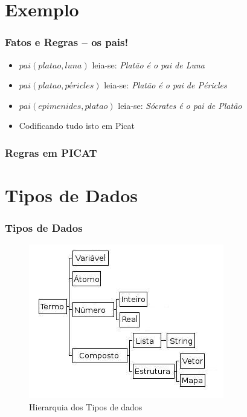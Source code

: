 \documentclass[10pt]{beamer}
\begin{document}

\section{Exemplo}
\begin{frame}
    \frametitle{Fatos e Regras -- os pais!}
    \begin{itemize}
    
    \item $pai(platao, luna)$ \hspace{1.5cm} leia-se: \textit{Platão é o pai de Luna}
    \item $pai(platao, péricles)$ \hspace{1.5cm} leia-se: \textit{Platão é o pai de Péricles}
    \item $pai(epimenides, platao)$ \hspace{1.5cm} leia-se: \textit{Sócrates é o pai de Platão}
    \item Codificando tudo isto  em Picat
    \end{itemize}
\end{frame}

\begin{frame}[allowframebreaks=0.9]
 \frametitle{Regras em PICAT}



\end{frame}



\section{Tipos de Dados}

\begin{frame}
\frametitle{Tipos de Dados}
\begin{figure}[!ht]
\centering
\includegraphics[width=.6\textwidth]{figures/tipos_dados_picat_traduzido.jpg}
\caption{Hierarquia dos Tipos de dados}
\label{Hiera}
\end{figure}
\end{frame}
\end{document}
